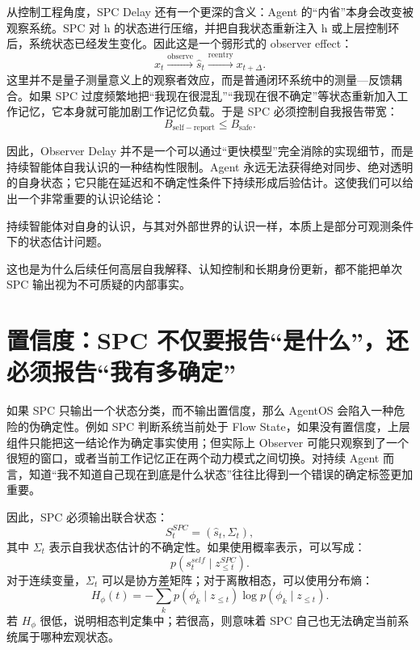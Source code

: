从控制工程角度，SPC Delay 还有一个更深的含义：Agent 的“内省”本身会改变被观察系统。SPC 对 h 的状态进行压缩，并把自我状态重新注入 h 或上层控制环后，系统状态已经发生变化。因此这是一个弱形式的 observer effect：
\begin{equation}
x_t
\overset{\mathrm{observe}}{\longrightarrow}
\hat s_t
\overset{\mathrm{reentry}}{\longrightarrow}
x_{t+\Delta}.
\end{equation}
这里并不是量子测量意义上的观察者效应，而是普通闭环系统中的测量—反馈耦合。如果 SPC 过度频繁地把“我现在很混乱”“我现在很不确定”等状态重新加入工作记忆，它本身就可能加剧工作记忆负载。于是 SPC 必须控制自我报告带宽：
\begin{equation}
B_{\mathrm{self-report}}
\leq
B_{\mathrm{safe}}.
\end{equation}

因此，Observer Delay 并不是一个可以通过“更快模型”完全消除的实现细节，而是持续智能体自我认识的一种结构性限制。Agent 永远无法获得绝对同步、绝对透明的自身状态；它只能在延迟和不确定性条件下持续形成后验估计。这使我们可以给出一个非常重要的认识论结论：
\begin{statementbox}
持续智能体对自身的认识，与其对外部世界的认识一样，本质上是部分可观测条件下的状态估计问题。
\end{statementbox}
这也是为什么后续任何高层自我解释、认知控制和长期身份更新，都不能把单次 SPC 输出视为不可质疑的内部事实。

\section{置信度：SPC 不仅要报告“是什么”，还必须报告“我有多确定”}
\label{sec:spc-confidence}

如果 SPC 只输出一个状态分类，而不输出置信度，那么 AgentOS 会陷入一种危险的伪确定性。例如 SPC 判断系统当前处于 Flow State，如果没有置信度，上层组件只能把这一结论作为确定事实使用；但实际上 Observer 可能只观察到了一个很短的窗口，或者当前工作记忆正在两个动力模式之间切换。对持续 Agent 而言，知道“我不知道自己现在到底是什么状态”往往比得到一个错误的确定标签更加重要。

因此，SPC 必须输出联合状态：
\begin{equation}
S_t^{SPC}
=
\left(
\hat s_t,
\Sigma_t
\right),
\end{equation}
其中 $\Sigma_t$ 表示自我状态估计的不确定性。如果使用概率表示，可以写成：
\begin{equation}
p
\left(
s_t^{self}
\mid
z_{\leq t}^{SPC}
\right).
\end{equation}
对于连续变量，$\Sigma_t$ 可以是协方差矩阵；对于离散相态，可以使用分布熵：
\begin{equation}
H_{\phi}(t)
=
-\sum_k
p(\phi_k\mid z_{\leq t})
\log
p(\phi_k\mid z_{\leq t}).
\end{equation}
若 $H_\phi$ 很低，说明相态判定集中；若很高，则意味着 SPC 自己也无法确定当前系统属于哪种宏观状态。

